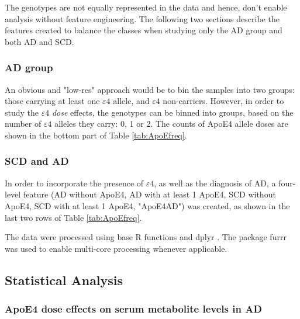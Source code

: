 \documentclass{amsart}
\begin{document}
The genotypes are not equally represented in the data and hence, don't enable analysis without feature engineering. The following two sections describe the features created to balance the classes when studying only the AD group and both AD and SCD.

\subsubsection{AD group}
An obvious and "low-res" approach would be to bin the samples into two groups: those carrying at least one $\varepsilon4$ allele, and $\varepsilon4$ non-carriers. However, in order to study the $\varepsilon4$ \textit{dose} effects, the genotypes can be binned into groups, based on the number of $\varepsilon4$ alleles they carry: 0, 1 or 2. The counts of ApoE4 allele doses are shown in the bottom part of Table \ref{tab:ApoEfreq}.

\subsubsection{SCD and AD}
In order to incorporate the presence of $\varepsilon4$, as well as the diagnosis of AD, a four-level feature (AD without ApoE4, AD with at least 1 ApoE4, SCD without ApoE4, SCD with at least 1 ApoE4, "ApoE4AD") was created, as shown in the last two rows of Table \ref{tab:ApoEfreq}.

The data were processed using base R functions and \textsf{dplyr} \cite{dplyr}. The package \textsf{furrr} \cite{furrr} was used to enable multi-core processing whenever applicable.

\subsection{Statistical Analysis}
\subsubsection{ApoE4 dose effects on serum metabolite levels in AD}
\end{document}
